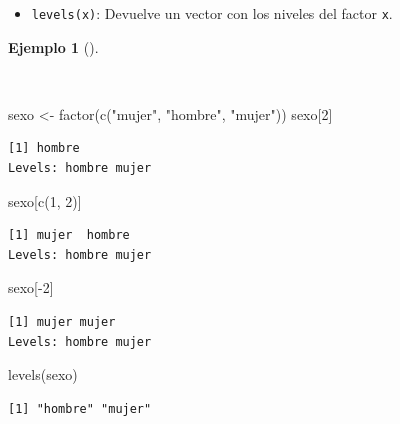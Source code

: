 \documentclass[
  a4paper,
]{scrreport}
\newenvironment{Shaded}{\begin{snugshade}}{\end{snugshade}}
\newcommand{\DecValTok}[1]{\textcolor[rgb]{0.68,0.00,0.00}{#1}}
\newcommand{\FunctionTok}[1]{\textcolor[rgb]{0.28,0.35,0.67}{#1}}
\newcommand{\NormalTok}[1]{\textcolor[rgb]{0.00,0.23,0.31}{#1}}
\newcommand{\OtherTok}[1]{\textcolor[rgb]{0.00,0.23,0.31}{#1}}
\newcommand{\SpecialCharTok}[1]{\textcolor[rgb]{0.37,0.37,0.37}{#1}}
\newcommand{\StringTok}[1]{\textcolor[rgb]{0.13,0.47,0.30}{#1}}
\providecommand{\tightlist}{%
  \setlength{\itemsep}{0pt}\setlength{\parskip}{0pt}}\usepackage{longtable,booktabs,array}
\theoremstyle{definition}
\theoremstyle{definition}
\newtheorem{example}{Ejemplo}[chapter]
\theoremstyle{remark}
\begin{document}
\begin{itemize}
\tightlist
\item
  \texttt{levels(x)}: Devuelve un vector con los niveles del factor
  \texttt{x}.
\end{itemize}

\begin{example}[]\protect\hypertarget{exm-niveles-factor}{}\label{exm-niveles-factor}

~

\begin{Shaded}
\begin{Highlighting}[]
\NormalTok{sexo }\OtherTok{\textless{}{-}} \FunctionTok{factor}\NormalTok{(}\FunctionTok{c}\NormalTok{(}\StringTok{"mujer"}\NormalTok{, }\StringTok{"hombre"}\NormalTok{, }\StringTok{"mujer"}\NormalTok{))}
\NormalTok{sexo[}\DecValTok{2}\NormalTok{]}
\end{Highlighting}
\end{Shaded}

\begin{verbatim}
[1] hombre
Levels: hombre mujer
\end{verbatim}

\begin{Shaded}
\begin{Highlighting}[]
\NormalTok{sexo[}\FunctionTok{c}\NormalTok{(}\DecValTok{1}\NormalTok{, }\DecValTok{2}\NormalTok{)]}
\end{Highlighting}
\end{Shaded}

\begin{verbatim}
[1] mujer  hombre
Levels: hombre mujer
\end{verbatim}

\begin{Shaded}
\begin{Highlighting}[]
\NormalTok{sexo[}\SpecialCharTok{{-}}\DecValTok{2}\NormalTok{]}
\end{Highlighting}
\end{Shaded}

\begin{verbatim}
[1] mujer mujer
Levels: hombre mujer
\end{verbatim}

\begin{Shaded}
\begin{Highlighting}[]
\FunctionTok{levels}\NormalTok{(sexo)}
\end{Highlighting}
\end{Shaded}

\begin{verbatim}
[1] "hombre" "mujer" 
\end{verbatim}

\end{example}
\end{document}
